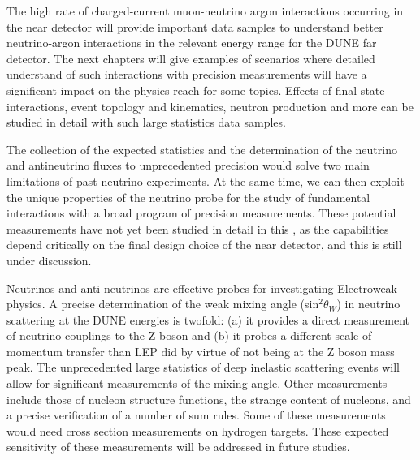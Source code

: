 The high rate of charged-current muon-neutrino argon interactions occurring in 
the near detector will provide important data samples to understand better neutrino-argon 
interactions in the relevant energy range for the DUNE far detector. The next chapters
will give examples of scenarios where detailed understand of such interactions with 
precision measurements will have a significant impact on the physics reach for some
topics. Effects of final state interactions, event topology and kinematics, neutron production and more can be studied in detail with such large statistics 
data samples.

The collection of the expected statistics and the determination of the neutrino and
antineutrino fluxes to unprecedented precision would solve  two main limitations of past neutrino experiments. At the same time, we can then exploit the unique
properties of the neutrino probe for the study of fundamental interactions with a broad program of precision  measurements. These potential measurements
have not yet been studied in detail in this , as the capabilities
depend critically on the final design choice of the near detector, and this is still under discussion.

Neutrinos and anti-neutrinos are effective probes for investigating Electroweak 
physics. A precise determination of the weak mixing angle (sin$^2\theta_W$) in neutrino
scattering at the DUNE energies is twofold: (a) it provides a direct measurement of neutrino
couplings to the Z boson and (b) it probes a different scale of momentum transfer than LEP
did by virtue of not being at the Z boson mass peak. The unprecedented large statistics
of deep inelastic scattering events will allow for significant measurements of the mixing 
angle. Other  measurements include those of nucleon structure functions, the strange content of nucleons, and a precise verification of a number of sum rules. 
Some of these measurements would need cross section measurements 
on hydrogen targets.  These expected sensitivity of these measurements will be addressed
in future studies.


